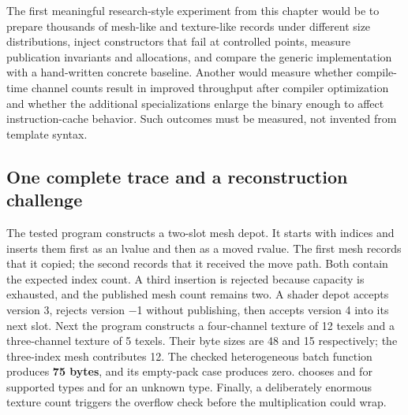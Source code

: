 The first meaningful research-style experiment from this chapter would be to prepare thousands of mesh-like and texture-like records under different size distributions, inject constructors that fail at controlled points, measure publication invariants and allocations, and compare the generic implementation with a hand-written concrete baseline. Another would measure whether compile-time channel counts result in improved throughput after compiler optimization and whether the additional specializations enlarge the binary enough to affect instruction-cache behavior. Such outcomes must be measured, not invented from template syntax.

\subsection{One complete trace and a reconstruction challenge}\label{05-engine-i-ch005-one-complete-trace-and-a-reconstruction-challenge}

\hypertarget{05-engine-i-ch005-one-complete-trace-and-a-reconstruction-challenge}{}

The tested program constructs a two-slot mesh depot. It starts with indices  and inserts them first as an lvalue and then as a moved rvalue. The first mesh records that it copied; the second records that it received the move path. Both contain the expected index count. A third insertion is rejected because capacity is exhausted, and the published mesh count remains two. A shader depot accepts version 3, rejects version −1 without publishing, then accepts version 4 into its next slot. Next the program constructs a four-channel texture of 12 texels and a three-channel texture of 5 texels. Their byte sizes are 48 and 15 respectively; the three-index mesh contributes 12. The checked heterogeneous batch function produces \textbf{75 bytes}, and its empty-pack case produces zero.  chooses  and  for supported types and  for an unknown type. Finally, a deliberately enormous texture count triggers the overflow check before the multiplication could wrap.


